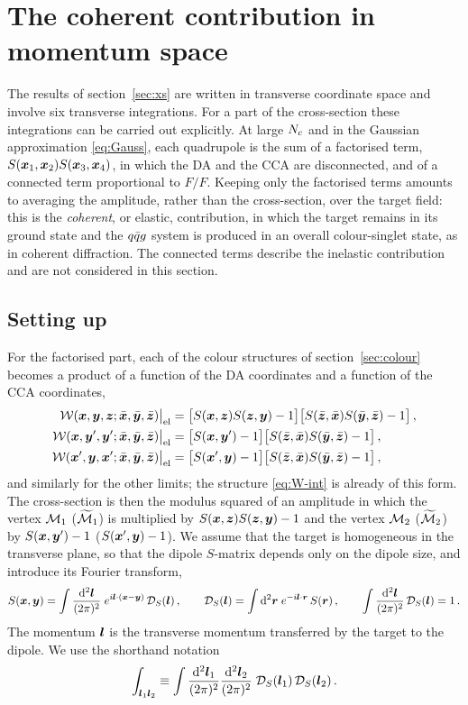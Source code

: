 \section{The coherent contribution in momentum space}
\label{sec:mom}

The results of section~\ref{sec:xs} are written in transverse coordinate space and involve six
transverse integrations. For a part of the cross-section these integrations can be carried out
explicitly. At large $N_c$ and in the Gaussian approximation \eqref{eq:Gauss}, each quadrupole is the
sum of a factorised term, $S(\bm{x}_1,\bm{x}_2)S(\bm{x}_3,\bm{x}_4)$, in which the DA and the CCA are disconnected,
and of a connected term proportional to $F/F$. Keeping only the factorised terms amounts to averaging
the amplitude, rather than the cross-section, over the target field: this is the \emph{coherent}, or
elastic, contribution, in which the target remains in its ground state and the $q\bar q g$ system is
produced in an overall colour-singlet state, as in coherent diffraction. The connected terms describe
the inelastic contribution and are not considered in this section.

\subsection{Setting up}

For the factorised part, each of the colour structures of section~\ref{sec:colour} becomes a product of
a function of the DA coordinates and a function of the CCA coordinates,
\begin{align}
\mathcal{W}(\bm{x},\bm{y},\bm{z};\bar{\bm{x}},\bar{\bm{y}},\bar{\bm{z}})\big|_{\rm el}&=\big[S(\bm{x},\bm{z})S(\bm{z},\bm{y})-1\big]\big[S(\bar{\bm{z}},\bar{\bm{x}})S(\bar{\bm{y}},\bar{\bm{z}})-1\big]\,,
\nonumber\\
\mathcal{W}(\bm{x},\bm{y}',\bm{y}';\bar{\bm{x}},\bar{\bm{y}},\bar{\bm{z}})\big|_{\rm el}&=\big[S(\bm{x},\bm{y}')-1\big]\big[S(\bar{\bm{z}},\bar{\bm{x}})S(\bar{\bm{y}},\bar{\bm{z}})-1\big]\,,
\nonumber\\
\mathcal{W}(\bm{x}',\bm{y},\bm{x}';\bar{\bm{x}},\bar{\bm{y}},\bar{\bm{z}})\big|_{\rm el}&=\big[S(\bm{x}',\bm{y})-1\big]\big[S(\bar{\bm{z}},\bar{\bm{x}})S(\bar{\bm{y}},\bar{\bm{z}})-1\big]\,,
\label{eq:W-el}
\end{align}
and similarly for the other limits; the structure \eqref{eq:W-int} is already of this form. The
cross-section is then the modulus squared of an amplitude in which the vertex $\mathcal{M}_1$ ($\widetilde{\mathcal{M}}_1$) is
multiplied by $S(\bm{x},\bm{z})S(\bm{z},\bm{y})-1$ and the vertex $\mathcal{M}_2$ ($\widetilde{\mathcal{M}}_2$) by $S(\bm{x},\bm{y}')-1$ ($S(\bm{x}',\bm{y})-1$).
We assume that the target is homogeneous in the transverse plane, so that the dipole $S$-matrix depends
only on the dipole size, and introduce its Fourier transform,
\begin{equation}
S(\bm{x},\bm{y})=\int\frac{{\rm d}^2\bm{l}}{(2\pi)^2}\;e^{i\bm{l}\cdot(\bm{x}-\bm{y})}\,\mathcal{D}_S(\bm{l})\,,\qquad
\mathcal{D}_S(\bm{l})=\int{\rm d}^2\bm{r}\;e^{-i\bm{l}\cdot\bm{r}}\,S(\bm{r})\,,\qquad
\int\frac{{\rm d}^2\bm{l}}{(2\pi)^2}\,\mathcal{D}_S(\bm{l})=1\,.
\label{eq:DS}
\end{equation}
The momentum $\bm{l}$ is the transverse momentum transferred by the target to the dipole. We use the
shorthand notation
\begin{equation}
\int_{\bm{l}_1\bm{l}_2}\equiv\int\frac{{\rm d}^2\bm{l}_1}{(2\pi)^2}\frac{{\rm d}^2\bm{l}_2}{(2\pi)^2}\;\mathcal{D}_S(\bm{l}_1)\,\mathcal{D}_S(\bm{l}_2)\,.
\label{eq:measure}
\end{equation}

